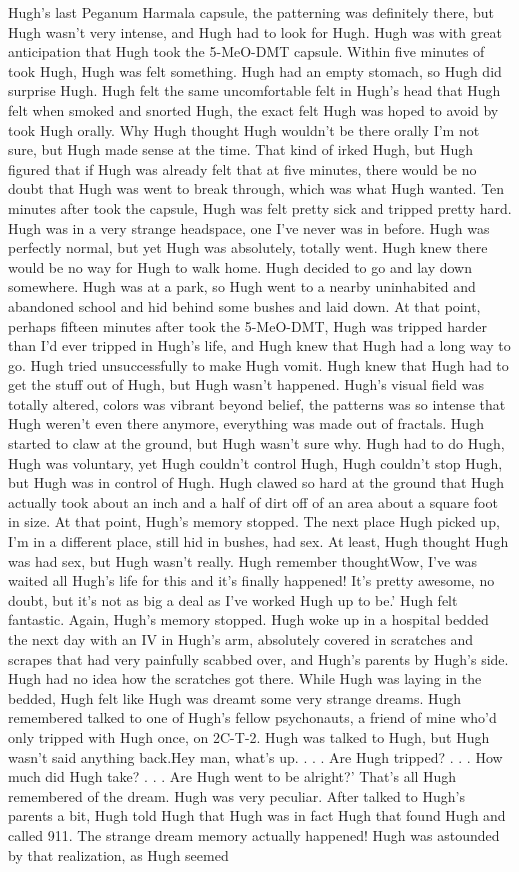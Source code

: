 \documentclass[12pt]{book}
\begin{document}
Hugh's last Peganum Harmala capsule, the patterning was definitely there, but Hugh wasn't very intense, and Hugh had to look for Hugh. Hugh was with great anticipation that Hugh took the 5-MeO-DMT capsule. Within five minutes of took Hugh, Hugh was felt something. Hugh had an empty stomach, so Hugh did surprise Hugh. Hugh felt the same uncomfortable felt in Hugh's head that Hugh felt when smoked and snorted Hugh, the exact felt Hugh was hoped to avoid by took Hugh orally. Why Hugh thought Hugh wouldn't be there orally I'm not sure, but Hugh made sense at the time. That kind of irked Hugh, but Hugh figured that if Hugh was already felt that at five minutes, there would be no doubt that Hugh was went to break through, which was what Hugh wanted. Ten minutes after took the capsule, Hugh was felt pretty sick and tripped pretty hard. Hugh was in a very strange headspace, one I've never was in before. Hugh was perfectly normal, but yet Hugh was absolutely, totally went. Hugh knew there would be no way for Hugh to walk home. Hugh decided to go and lay down somewhere. Hugh was at a park, so Hugh went to a nearby uninhabited and abandoned school and hid behind some bushes and laid down. At that point, perhaps fifteen minutes after took the 5-MeO-DMT, Hugh was tripped harder than I'd ever tripped in Hugh's life, and Hugh knew that Hugh had a long way to go. Hugh tried unsuccessfully to make Hugh vomit. Hugh knew that Hugh had to get the stuff out of Hugh, but Hugh wasn't happened. Hugh's visual field was totally altered, colors was vibrant beyond belief, the patterns was so intense that Hugh weren't even there anymore, everything was made out of fractals. Hugh started to claw at the ground, but Hugh wasn't sure why. Hugh had to do Hugh, Hugh was voluntary, yet Hugh couldn't control Hugh, Hugh couldn't stop Hugh, but Hugh was in control of Hugh. Hugh clawed so hard at the ground that Hugh actually took about an inch and a half of dirt off of an area about a square foot in size. At that point, Hugh's memory stopped. The next place Hugh picked up, I'm in a different place, still hid in bushes, had sex. At least, Hugh thought Hugh was had sex, but Hugh wasn't really. Hugh remember thoughtWow, I've was waited all Hugh's life for this and it's finally happened! It's pretty awesome, no doubt, but it's not as big a deal as I've worked Hugh up to be.' Hugh felt fantastic. Again, Hugh's memory stopped. Hugh woke up in a hospital bedded the next day with an IV in Hugh's arm, absolutely covered in scratches and scrapes that had very painfully scabbed over, and Hugh's parents by Hugh's side. Hugh had no idea how the scratches got there. While Hugh was laying in the bedded, Hugh felt like Hugh was dreamt some very strange dreams. Hugh remembered talked to one of Hugh's fellow psychonauts, a friend of mine who'd only tripped with Hugh once, on 2C-T-2. Hugh was talked to Hugh, but Hugh wasn't said anything back.Hey man, what's up.  . . .  Are Hugh tripped?  . . .  How much did Hugh take?  . . .  Are Hugh went to be alright?' That's all Hugh remembered of the dream. Hugh was very peculiar. After talked to Hugh's parents a bit, Hugh told Hugh that Hugh was in fact Hugh that found Hugh and called 911. The strange dream memory actually happened! Hugh was astounded by that realization, as Hugh seemed 
\end{document}
